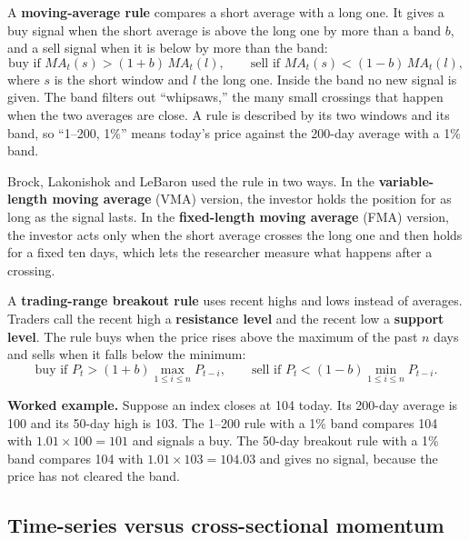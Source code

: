 A \textbf{moving-average rule} compares a short average with a long one. It gives a buy signal when the short average is above the long one by more than a band $b$, and a sell signal when it is below by more than the band:
\begin{equation}
  \text{buy if } MA_t(s) > (1+b)\,MA_t(l), \qquad \text{sell if } MA_t(s) < (1-b)\,MA_t(l),
  \label{eq:08-marule}
\end{equation}
where $s$ is the short window and $l$ the long one. Inside the band no new signal is given. The band filters out ``whipsaws,'' the many small crossings that happen when the two averages are close. A rule is described by its two windows and its band, so ``1--200, 1\%'' means today's price against the 200-day average with a 1\% band.

Brock, Lakonishok and LeBaron used the rule in two ways. In the \textbf{variable-length moving average} (VMA) version, the investor holds the position for as long as the signal lasts. In the \textbf{fixed-length moving average} (FMA) version, the investor acts only when the short average crosses the long one and then holds for a fixed ten days, which lets the researcher measure what happens after a crossing.

A \textbf{trading-range breakout rule} uses recent highs and lows instead of averages. Traders call the recent high a \textbf{resistance level} and the recent low a \textbf{support level}. The rule buys when the price rises above the maximum of the past $n$ days and sells when it falls below the minimum:
\begin{equation}
  \text{buy if } P_t > (1+b)\max_{1\le i\le n} P_{t-i}, \qquad \text{sell if } P_t < (1-b)\min_{1\le i\le n} P_{t-i}.
  \label{eq:08-trb}
\end{equation}

\textbf{Worked example.} Suppose an index closes at 104 today. Its 200-day average is 100 and its 50-day high is 103. The 1--200 rule with a 1\% band compares 104 with $1.01 \times 100 = 101$ and signals a buy. The 50-day breakout rule with a 1\% band compares 104 with $1.01 \times 103 = 104.03$ and gives no signal, because the price has not cleared the band.

\subsection{Time-series versus cross-sectional momentum}

